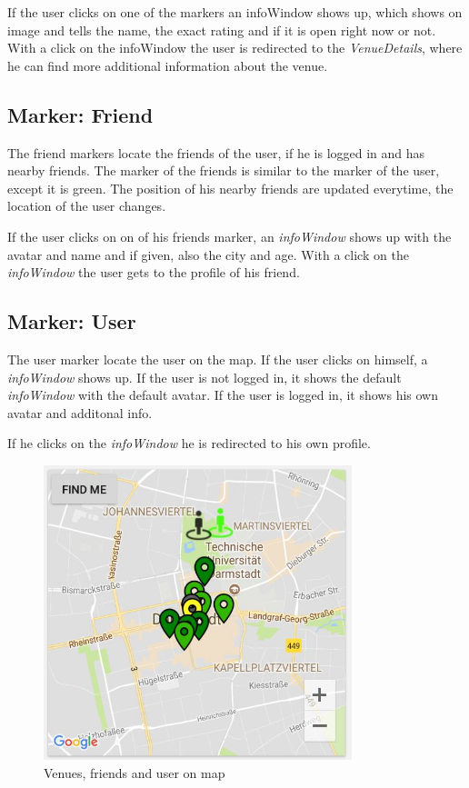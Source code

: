 If the user clicks on one of the markers an infoWindow shows up, which shows on image and tells the name, the exact rating and if it is open right now or not. With a click on the infoWindow the user is redirected to the \textit{VenueDetails}, where he can find more additional information about the venue.

\subsection{Marker: Friend}
The friend markers locate the friends of the user, if he is logged in and has nearby friends. The marker of the friends is similar to the marker of the user, except it is green.
The position of his nearby friends are updated everytime, the location of the user changes. 

If the user clicks on on of his friends marker, an \textit{infoWindow} shows up with the avatar and name and if given, also the city and age. With a click on the \textit{infoWindow} the user gets to the profile of his friend.

\subsection{Marker: User}
The user marker locate the user on the map. If the user clicks on himself, a \textit{infoWindow} shows up. If the user is not logged in, it shows the default \textit{infoWindow} with the default avatar. If the user is logged in, it shows his own avatar and additonal info. 

If he clicks on the \textit{infoWindow} he is redirected to his own profile.

\begin{figure}[htbp]
 	\includegraphics[width=0.8\textwidth]{images/venuesonmap.jpg}
 	\centering
 	\caption[]{Venues, friends and user on map}
 	\label{fig:venuesonmap}
\end{figure}


